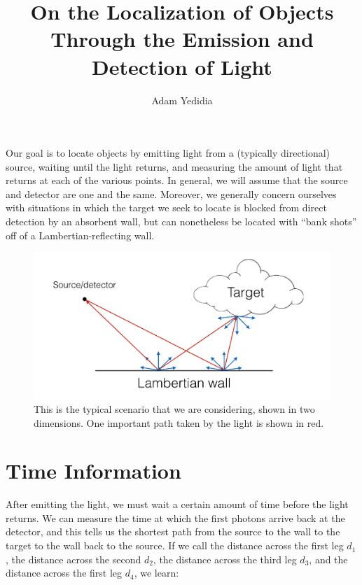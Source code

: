 \documentclass[11pt]{article}
\title{On the Localization of Objects Through the Emission and Detection of Light}
\author{Adam Yedidia}
\begin{document}
    
\maketitle

Our goal is to locate objects by emitting light from a (typically directional) source, waiting until the light returns, and measuring the amount of light that returns at each of the various points. In general, we will assume that the source and detector are one and the same. Moreover, we generally concern ourselves with situations in which the target we seek to locate is blocked from direct detection by an absorbent wall, but can nonetheless be located with ``bank shots'' off of a Lambertian-reflecting wall.

\begin{figure} 
\begin{center} 
\includegraphics[scale=0.4]{figs/typical_scenario.png} 
\caption{This is the typical scenario that we are considering, shown in two dimensions. One important path taken by the light is shown in red.} 
\end{center} 
\end{figure}

\section{Time Information}

After emitting the light, we must wait a certain amount of time before the light returns. We can measure the time at which the first photons arrive back at the detector, and this tells us the shortest path from the source to the wall to the target to the wall back to the source. If we call the distance across the first leg $d_1$, the distance across the second $d_2$, the distance across the third leg $d_3$, and the distance across the first leg $d_4$, we learn:
\end{document}
